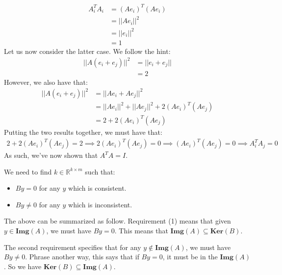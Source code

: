 \documentclass[12pt]{exam}
\newcommand{\Q}[1]{\question{\large{\textbf{#1}}}}
\begin{document}
\begin{questions}
\begin{solution}
    \begin{align*}
      A_i^TA_i &= (Ae_i)^T(Ae_i) \tag{Multiplying $A$ by $e_i$ extracts the $i$-th column} \\
      &= ||Ae_i||^2 \tag{Definition of dot product treating $Ae_i$ as a vector} \\
      &= ||e_i||^2 \tag{Multiplication by $A$ preserves the norm} \\
      &= 1
    \end{align*}
    Let us now consider the latter case. We follow the hint:
    \begin{align*}
    ||A(e_i + e_j)||^2 &= ||e_i + e_j|| \tag{$A$ preserves norm} \\
    &= 2
    \end{align*}
    However, we also have that:
    \begin{align*}
    ||A(e_i + e_j)||^2 &= ||Ae_i + Ae_j||^2 \tag{Linearity of $A$} \\
    &= ||Ae_i||^2 + ||Ae_j||^2 + 2(Ae_i)^T(Ae_j) \tag{Definition of vector norm} \\
    &= 2 + 2(Ae_i)^T(Ae_j) \tag{Using previous results}
    \end{align*}
    Putting the two results together, we must have that:
    \begin{align*}
      2 + 2(Ae_i)^T(Ae_j) = 2 \implies 2(Ae_i)^T(Ae_j) = 0 \implies (Ae_i)^T(Ae_j) = 0 \implies A_i^TA_j = 0
    \end{align*}
    As such, we've now shown that $A^TA = I$.
  \end{solution}


\newpage
\Q{Sensor integrity monitor}
  \begin{solution}
    We need to find $k \in \mathbb{R}^{k \times m}$ such that:
      \begin{itemize}
        \item $By = 0$ for any $y$ which is consistent.
        \item $By \neq 0$ for any $y$ which is inconsistent.
      \end{itemize}

    The above can be summarized as follow. Requirement (1) means that given $y \in \textbf{Img}(A)$, we must have $By = 0$. This means that $\textbf{Img}(A) \subseteq \textbf{Ker}(B) $.

    The second requirement specifies that for any $y \notin \textbf{Img}(A)$, we must have $By \neq 0$. Phrase another way, this says that if $By = 0$, it must be in the $\textbf{Img}(A)$. So we have $\textbf{Ker}(B) \subseteq \textbf{Img}(A)$.


\end{solution}
\end{questions}
\end{document}
